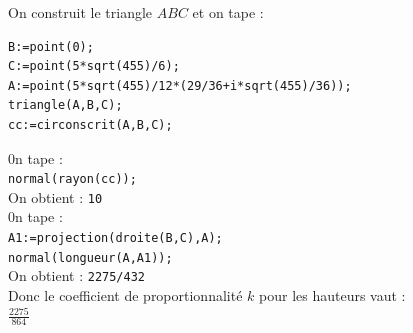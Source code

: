 \documentclass[a4paper,11pt]{book}
\begin{document}
On construit le triangle $ABC$ et on tape :
\begin{verbatim}
B:=point(0);
C:=point(5*sqrt(455)/6);
A:=point(5*sqrt(455)/12*(29/36+i*sqrt(455)/36));
triangle(A,B,C);
cc:=circonscrit(A,B,C);
\end{verbatim}
0n tape :\\ 
{\tt normal(rayon(cc));}\\
On obtient : {\tt 10}\\
0n tape :\\ 
{\tt A1:=projection(droite(B,C),A);}\\
{\tt normal(longueur(A,A1));}\\
On obtient : {\tt 2275/432}\\
Donc le coefficient de proportionnalit\'e $k$ pour les hauteurs vaut : \\
$\displaystyle \frac{2275}{864}$
\end{document}
